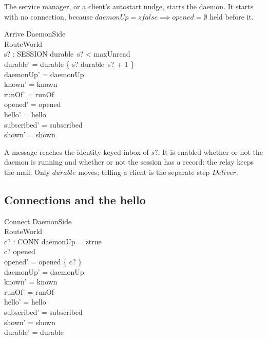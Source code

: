 \documentclass[a4paper,10pt,fleqn]{article}
\begin{document}
The service manager, or a client's autostart nudge, starts the daemon.
It starts with no connection, because $daemonUp = zfalse \implies opened =
\emptyset$ held before it.

\begin{schema}{Arrive}
  \Delta DaemonSide \\
  \Xi RouteWorld \\
  s? : SESSION
  \where
  durable~s? < maxUnread \\
  durable' = durable \oplus \{ s? \mapsto durable~s? + 1 \} \\
  daemonUp' = daemonUp \\
  known' = known \\
  runOf' = runOf \\
  opened' = opened \\
  hello' = hello \\
  subscribed' = subscribed \\
  shown' = shown
\end{schema}

A message reaches the identity-keyed inbox of $s?$.  It is enabled whether
or not the daemon is running and whether or not the session has a record:
the relay keeps the mail.  Only $durable$ moves; telling a client is the
separate step $Deliver$.

\subsection{Connections and the hello}

\begin{schema}{Connect}
  \Delta DaemonSide \\
  \Xi RouteWorld \\
  c? : CONN
  \where
  daemonUp = ztrue \\
  c? \notin opened \\
  opened' = opened \cup \{ c? \} \\
  daemonUp' = daemonUp \\
  known' = known \\
  runOf' = runOf \\
  hello' = hello \\
  subscribed' = subscribed \\
  shown' = shown \\
  durable' = durable
\end{schema}
\end{document}
